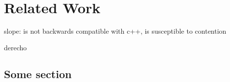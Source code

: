 \chapter{Related Work}
\label{chap:related}

slope: is not backwards compatible with c++, is susceptible to contention

derecho


\section{Some section}
